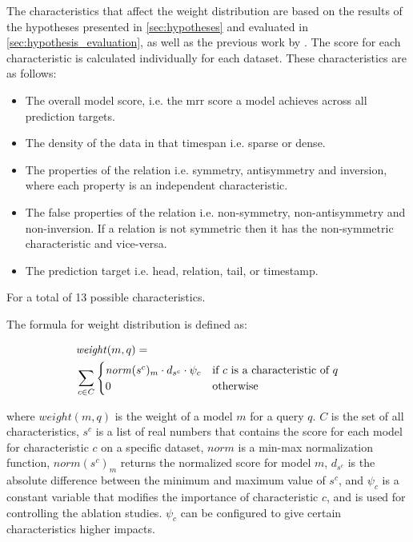 The characteristics that affect the weight distribution are based on the results of the hypotheses presented in \autoref{sec:hypotheses} and evaluated in \autoref{sec:hypothesis_evaluation}, as well as the previous work by \cite{P9}. The score for each characteristic is calculated individually for each dataset.
These characteristics are as follows: 
\begin{itemize}
    \item The overall model score, i.e. the \gls{mrr} score a model achieves across all prediction targets.
    \item The density of the data in that timespan i.e. sparse or dense.
    \item The properties of the relation i.e. symmetry, antisymmetry and inversion, 
    where each property is an independent characteristic.
    \item The false properties of the relation i.e. non-symmetry, non-antisymmetry and non-inversion. If a relation is not symmetric then it has the non-symmetric characteristic and vice-versa.
    \item The prediction target i.e. head, relation, tail, or timestamp.
\end{itemize}

\noindent
For a total of 13 possible characteristics.

The formula for weight distribution is defined as:

\begin{equation} 
\begin{aligned}
&\mathit{weight}(m, q) = \\
&\sum\limits_{c \in C} 
\begin{cases}
\mathit{norm}(s^c)_m \cdot d_{s^c} \cdot \psi_c & \text{if } c \text{ is a characteristic of } q \\
0 & \text{otherwise}
\end{cases}
\end{aligned}
\end{equation}

\noindent
where $\mathit{weight}(m, q)$ is the weight of a model $m$ for a query $q$.
$C$ is the set of all characteristics, $s^c$ is a list of real numbers that contains the score for each model for characteristic $c$ on a specific dataset, $\mathit{norm}$ is a min-max normalization function, $\mathit{norm}(s^c)_m$ returns the normalized score for model $m$, $d_{s^c}$ is the absolute difference between the minimum and maximum value of $s^c$, and $\psi_c$ is a constant variable that modifies the importance of characteristic $c$, and is used for controlling the ablation studies.
$\psi_c$ can be configured to give certain characteristics higher impacts.

